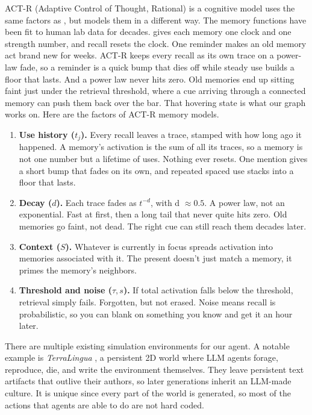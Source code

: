 \documentclass{article}
\begin{document}
ACT-R (Adaptive Control of Thought, Rational) \parencite{honda2026actr} is a cognitive model uses the same factors as \textcite{hou2024humanrecall}, but models them in a different way.
The memory functions have been fit to human lab data for decades.
\textcite{hou2024humanrecall} gives each memory one clock and one strength number, and recall resets the clock.
One reminder makes an old memory act brand new for weeks.
ACT-R keeps every recall as its own trace on a power-law fade, so a reminder is a quick bump that dies off while steady use builds a floor that lasts.
And a power law never hits zero.
Old memories end up sitting faint just under the retrieval threshold, where a cue arriving through a connected memory can push them back over the bar.
That hovering state is what our graph works on.
Here are the factors of ACT-R memory models.
\begin{enumerate}
    \item \textbf{Use history ($t_j$).}
        Every recall leaves a trace, stamped with how long ago it happened. A memory's activation is the sum of all its traces, so a memory is not one number but a lifetime of uses. Nothing ever resets. One mention gives a short bump that fades on its own, and repeated spaced use stacks into a floor that lasts.
    \item\textbf{Decay ($d$).}
        Each trace fades as $t^{−d}$, with d $\approx 0.5$. A power law, not an exponential. Fast at first, then a long tail that never quite hits zero. Old memories go faint, not dead. The right cue can still reach them decades later.
    \item\textbf{Context ($S$).}
        Whatever is currently in focus spreads activation into memories associated with it. The present doesn't just match a memory, it primes the memory's neighbors.
    \item\textbf{Threshold and noise ($\tau, s$).}
        If total activation falls below the threshold, retrieval simply fails. Forgotten, but not erased. Noise means recall is probabilistic, so you can blank on something you know and get it an hour later.
\end{enumerate}

There are multiple existing simulation environments for our agent.
A notable example is \textit{TerraLingua} \parencite{paolo2026terralinguaemergenceanalysisopenendedness}, a persistent 2D world where LLM agents forage, reproduce, die, and write the environment themselves.
They leave persistent text artifacts that outlive their authors, so later generations inherit an LLM-made culture.
It is unique since every part of the world is generated, so most of the actions that agents are able to do are not hard coded.
\end{document}
